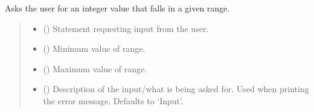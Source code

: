 \documentclass[letterpaper,10pt,english]{sphinxmanual}
\begin{document}
\begin{fulllineitems}

\begin{fulllineitems}
\label{\detokenize{GetUserInput:GetUserInput.UserInput.AskForIntInRange}}
\pysigstartsignatures
{}
\pysigstopsignatures
\sphinxAtStartPar
Asks the user for an integer value that falls in a given range.
\begin{quote}\begin{description}
\begin{itemize}
\item {} 
\sphinxAtStartPar
{} () \textendash{} Statement requesting input from the user.

\item {} 
\sphinxAtStartPar
{} () \textendash{} Minimum value of range.

\item {} 
\sphinxAtStartPar
{} () \textendash{} Maximum value of range.

\item {} 
\sphinxAtStartPar
{} (\sphinxstyleliteralemphasis{\sphinxupquote{, }}) \textendash{} Description of the input/what is being asked for. Used when printing                 the error message. Defaults to ‘Input’.


\end{itemize}
\end{description}
\end{quote}
\end{fulllineitems}
\end{fulllineitems}
\end{document}
